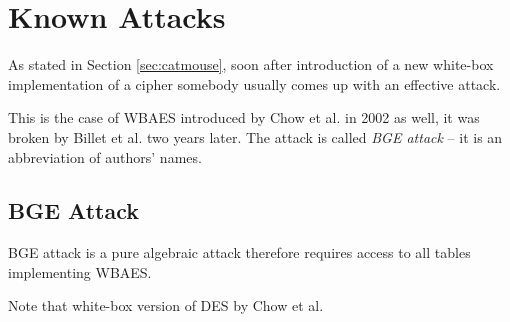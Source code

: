\section{Known Attacks}
\label{sec:known}

As stated in Section \ref{sec:catmouse}, soon after introduction of a new white-box implementation of a cipher somebody usually comes up with an effective attack. %

This is the case of WBAES introduced by Chow et al. \cite{chow2003aes} in 2002 as well, it was broken by Billet et al. \cite{billet2005cryptanalysis} two years later. The attack is called {\em BGE attack} -- it is an abbreviation of authors' names.



\subsection{BGE Attack}

BGE attack is a pure algebraic attack therefore requires access to all tables implementing WBAES. %

Note that white-box version of DES by Chow et al. \cite{chow2003des} 
